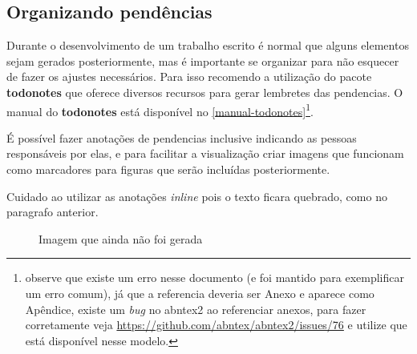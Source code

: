 \subsection{Organizando pendências}

Durante o desenvolvimento de um trabalho escrito é normal que alguns elementos sejam gerados posteriormente, mas é importante se organizar para não esquecer de fazer os ajustes necessários. Para isso recomendo a utilização do pacote \textbf{todonotes} que oferece diversos recursos para gerar lembretes das pendencias. O manual do \textbf{todonotes} está disponível no \autoref{manual-todonotes}\footnote{observe que existe um erro nesse documento (e foi mantido para exemplificar um erro comum), já que a referencia deveria ser Anexo e aparece como Apêndice,  existe um \textit{bug} no abntex2 ao referenciar anexos, para fazer corretamente veja \url{https://github.com/abntex/abntex2/issues/76} e utilize  que está disponível nesse modelo.}.

É possível fazer anotações de pendencias inclusive indicando as pessoas responsáveis por elas, %
 e para facilitar a visualização criar imagens que funcionam como marcadores para figuras que serão incluídas posteriormente.

Cuidado ao utilizar as anotações \textit{inline} pois o texto ficara quebrado, como no paragrafo anterior.


\begin{figure}[htb]
    \centering
	\caption{\label{fig_todo1}Imagem que ainda não foi gerada}
\end{figure}


